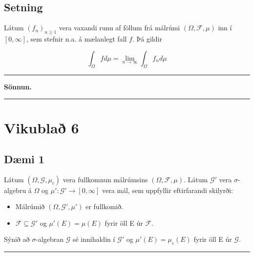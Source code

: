 \documentclass[]{book}
\begin{document}
\hypertarget{setning-49}{%
\section{Setning}\label{setning-49}}

Látum \((f_n)_{n\geq1}\) vera vaxandi runu af föllum frá málrúmi \((\Omega, \mathcal F, \mu)\) inn í \([0, \infty]\), sem stefnir n.a. á mælanlegt fall \(f\). Þá gildir

\[
\int_\Omega fd\mu = \lim_{n\rightarrow\infty}\int_\Omega f_n d\mu
\]

\begin{center}\rule{0.5\linewidth}{\linethickness}\end{center}

\textbf{Sönnun.}

\begin{center}\rule{0.5\linewidth}{\linethickness}\end{center}

\hypertarget{vikubla-6}{%
\chapter*{Vikublað 6}\label{vikubla-6}}

\hypertarget{dmi-1-3}{%
\section*{Dæmi 1}\label{dmi-1-3}}

Látum \((\Omega, \mathcal G, \mu_c)\) vera fullkomnun málrúmsins \((\Omega, \mathcal F, \mu)\). Látum \(\mathcal G'\) vera \(\sigma\)-algebru á \(\Omega\) og \(\mu': \mathcal G' \rightarrow [0,\infty]\) vera mál, sem uppfyllir eftirfarandi skilyrði:

\begin{itemize}
\item
  Málrúmið \((\Omega, \mathcal G', \mu')\) er fullkomið.
\item
  \(\mathcal F \subseteq \mathcal G'\) og \(\mu'(E) = \mu(E)\) fyrir öll E úr \(\mathcal F\).
\end{itemize}

Sýnið að \(\sigma\)-algebran \(\mathcal G\) sé innihaldin í \(\mathcal G'\) og \(\mu'(E) = \mu_c(E)\) fyrir öll E úr \(\mathcal G\).

\begin{center}\rule{0.5\linewidth}{\linethickness}\end{center}
\end{document}

